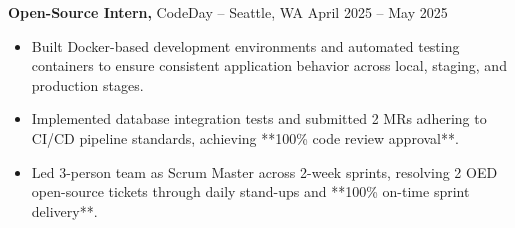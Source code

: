 \documentclass[11pt]{article}       %
\begin{document}
\textbf{Open-Source Intern,} {CodeDay} -- Seattle, WA \hfill April 2025 -- May 2025 
\vspace{-9pt}
\begin{itemize}
  \item Built Docker-based development environments and automated testing containers to ensure consistent application behavior across local, staging, and production stages.
  \item Implemented database integration tests and submitted 2 MRs adhering to CI/CD pipeline standards, achieving **100\% code review approval**.
  \item Led 3-person team as Scrum Master across 2-week sprints, resolving 2 OED open-source tickets through daily stand-ups and **100\% on-time sprint delivery**.
\end{itemize}

\end{document}
